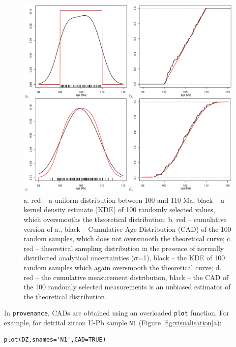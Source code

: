 \documentclass{article}
\begin{document}
\begin{figure}
\centering
\includegraphics[width=\textwidth]{synthplots.png}
\caption{a. red -- a uniform distribution between 100 and 110 Ma,
  black -- a kernel density estimate (KDE) of 100 randomly selected
  values, which oversmooths the theoretical distribution; b. red --
  cumulative version of a., black -- Cumulative Age Distribution (CAD)
  of the 100 random samples, which does not oversmooth the theoretical
  curve; c. red -- theoretical sampling distribution in the presence
  of normally distributed analytical uncertainties ($\sigma$=1), black
  -- the KDE of 100 random samples which again oversmooth the
  theoretical curve; d. red -- the cumulative measurement
  distribution, black -- the CAD of the 100 randomly selected
  measurements is an unbiased estimator of the theoretical
  distribution.}
\label{fig:synthplots}
\end{figure}

In {\tt provenance}, CADs are obtained using an overloaded {\tt plot}
function. For example, for detrital zircon U-Pb sample {\tt N1}
(Figure \ref{fig:visualisation}a):

\begin{verbatim}
plot(DZ,snames='N1',CAD=TRUE)
\end{verbatim}
\end{document}
